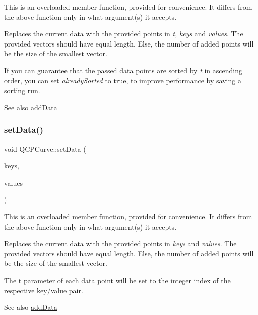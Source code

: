 This is an overloaded member function, provided for convenience. It differs from the above function only in what argument(s) it accepts.

Replaces the current data with the provided points in {\itshape t}, {\itshape keys} and {\itshape values}. The provided vectors should have equal length. Else, the number of added points will be the size of the smallest vector.

If you can guarantee that the passed data points are sorted by {\itshape t} in ascending order, you can set {\itshape already\+Sorted} to true, to improve performance by saving a sorting run.

\begin{DoxySeeAlso}{See also}
\mbox{\hyperlink{class_q_c_p_curve_a73edf394b94f3f24f07518e30565a07f}{add\+Data}} 
\end{DoxySeeAlso}
\mbox{\label{class_q_c_p_curve_a9d3245d43304226e013240c94802f7f6}} 
\subsubsection{\texorpdfstring{set\+Data()}{setData()}\hspace{0.1cm}{\footnotesize\ttfamily [3/3]}}
{\footnotesize\ttfamily void Q\+C\+P\+Curve\+::set\+Data (\begin{DoxyParamCaption}\item[{const Q\+Vector$<$ double $>$ \&}]{keys,  }\item[{const Q\+Vector$<$ double $>$ \&}]{values }\end{DoxyParamCaption})}

This is an overloaded member function, provided for convenience. It differs from the above function only in what argument(s) it accepts.

Replaces the current data with the provided points in {\itshape keys} and {\itshape values}. The provided vectors should have equal length. Else, the number of added points will be the size of the smallest vector.

The t parameter of each data point will be set to the integer index of the respective key/value pair.

\begin{DoxySeeAlso}{See also}
\mbox{\hyperlink{class_q_c_p_curve_a73edf394b94f3f24f07518e30565a07f}{add\+Data}} 
\end{DoxySeeAlso}
\mbox{\label{class_q_c_p_curve_a4a377ec863ff81a1875c3094a6177c19}} 
